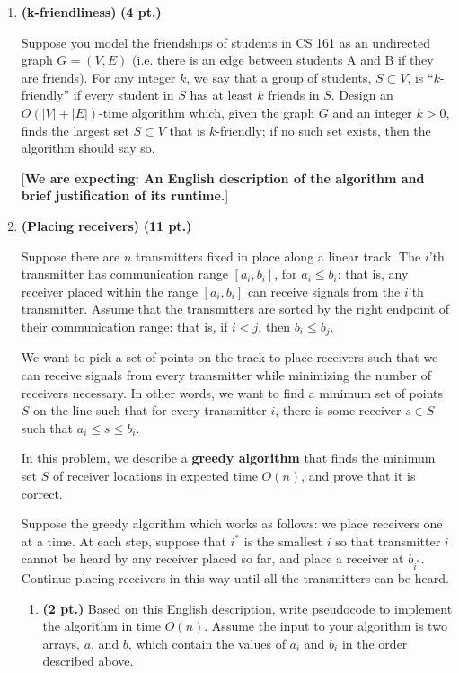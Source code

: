 \documentclass{article}
\begin{document}
\begin{enumerate}
  \item \textbf{(k-friendliness)} \textbf{(4 pt.)}

    Suppose you model the friendships of students in CS 161 as an undirected
    graph $G = (V,E)$ (i.e. there is an edge between students A and B if they
    are friends). For any integer $k$, we say that a group of students,
    $S \subset V$, is ``$k$-friendly'' if every student in $S$ has at least $k$
    friends in $S$. Design an $O(|V|+|E|)$-time algorithm which, given the graph
    $G$ and an integer $k > 0$, finds the largest set $S \subset V$ that is
    $k$-friendly; if no such set exists, then the algorithm should say so.
  
    [\textbf{We are expecting: An English description of the algorithm and
    brief justification of its runtime.}]
  
  \item \textbf{(Placing receivers)} \textbf{(11 pt.)}

    Suppose there are $n$ transmitters fixed in place along a linear track.
    The $i$'th transmitter has communication range $[a_i, b_i]$, for
    $a_i \leq b_i$: that is, any receiver placed within the range $[a_i, b_i]$
    can receive signals from the $i$'th transmitter. Assume that the
    transmitters are sorted by the right endpoint of their communication range:
    that is, if $i < j$, then $b_i \leq b_j$.

    We want to pick a set of points on the track to place receivers such that
    we can receive signals from every transmitter while minimizing the number
    of receivers necessary. In other words, we want to find a minimum set of
    points $S$ on the line such that for every transmitter $i$, there is some
    receiver $s \in S$ such that $a_i \leq s \leq b_i$. 

    In this problem, we describe a \textbf{greedy algorithm} that finds the
    minimum set $S$ of receiver locations in expected time $O(n)$, and prove
    that it is correct.

    Suppose the greedy algorithm which works as follows: we place receivers
    one at a time. At each step, suppose that $i^*$ is the smallest $i$ so that
    transmitter $i$ cannot be heard by any receiver placed so far, and place a
    receiver at $b_{i^*}$. Continue placing receivers in this way until all the
    transmitters can be heard.

    \begin{enumerate}
      \item \textbf{(2 pt.)} Based on this English description, write
        pseudocode to implement the algorithm in time $O(n)$. Assume the input
        to your algorithm is two arrays, $a$, and $b$, which contain the values
        of $a_i$ and $b_i$ in the order described above.


\end{enumerate}
\end{enumerate}
\end{document}
